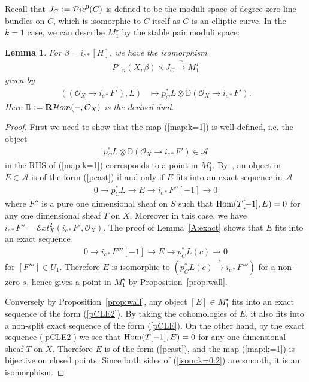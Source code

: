 \documentclass[11pt]{amsart}
\theoremstyle{plain}
\newtheorem{lem}[thm]{Lemma}
\newcommand{\aA}{\mathcal{A}}
\newcommand{\eE}{\mathcal{E}}
\newcommand{\hH}{\mathcal{H}}
\newcommand{\oO}{\mathcal{O}}
\newcommand{\pP}{\mathcal{P}}
\newcommand{\Hom}{\mathop{\rm Hom}\nolimits}
\newcommand{\dR}{\mathbf{R}}
\begin{document}
Recall that $J_C \cneq \pP ic^0(C)$ is defined 
to be the moduli space of degree zero line bundles on $C$, 
which is isomorphic to $C$ itself as $C$ is an elliptic curve. 
In the $k=1$ case, 
we can describe $M_1^{\star}$ 
by the stable pair moduli space: 
\begin{lem}
For $\beta=i_{c\ast}[H]$, we have 
the isomorphism 
\begin{align}
\label{isom:k=0:2}
P_{-n}(X, \beta) \times J_C \stackrel{\cong}{\to}
M_1^{\star}
\end{align}
given by 
\begin{align}
\label{map:k=1}
((\oO_X \to i_{c\ast}F'), L)
&\mapsto 
p_C^{\ast}L \otimes \mathbb{D}(\oO_X \to i_{c\ast}F'). 
 \end{align}
Here $\mathbb{D} \cneq \dR \hH om(-, \oO_X)$
is the derived dual. 
\end{lem}
\begin{proof}
First we need to 
show that 
the map (\ref{map:k=1}) is well-defined, i.e. 
the object 
\begin{align}\label{pcast}
p_C^{\ast}L \otimes \mathbb{D}(\oO_X \to i_{c\ast}F')
\in \aA
\end{align}
in the RHS of (\ref{map:k=1})
corresponds to a point in $M_1^{\star}$. 
By~\cite[Remark~9.8]{Toddbir},
an object in $E\in \aA$ is of the form (\ref{pcast})
if and only if $E$ fits into an exact sequence
in $\aA$
\begin{align}\label{pCLE}
0 \to p_C^{\ast}L \to E \to i_{c\ast}F''[-1] \to 0
\end{align}
where $F''$ is a pure one dimensional 
sheaf on $S$ such that 
$\Hom(T[-1], E)=0$ for any 
one dimensional sheaf $T$ on $X$. 
Moreover in this case, 
we have $i_{c\ast}F''=\eE xt_X^2(i_{c\ast}F', \oO_X)$. 
The proof of Lemma~\ref{A:exact} shows that $E$ fits into 
an exact sequence
\begin{align}\label{pCLE2}
0 \to i_{c\ast}F'''[-1] \to E \to p_C^{\ast}L(c) \to 0
\end{align}
for $[F'''] \in U_1$. 
Therefore $E$ is isomorphic to 
$(p_C^{\ast}L(c) \stackrel{s}{\to} i_{c\ast}F''')$
for a non-zero $s$, 
hence gives a point in $M_1^{\star}$ by 
Proposition~\ref{prop:wall}. 

Conversely by Proposition~\ref{prop:wall}, 
any object $[E] \in M_1^{\star}$
fits into an exact sequence of the form 
(\ref{pCLE2}).
By taking the cohomologies of $E$, 
 it also fits into a non-split
 exact sequence of the form (\ref{pCLE}).
On the other hand,
 by the exact sequence (\ref{pCLE2}) 
we see that
$\Hom(T[-1], E)=0$ for any 
one dimensional sheaf $T$ on $X$.
Therefore $E$ is of the form (\ref{pcast}), 
and the map (\ref{map:k=1})
is bijective on closed points. 
Since both sides of (\ref{isom:k=0:2}) 
are smooth, 
it is an isomorphism.  
\end{proof}
\end{document}
